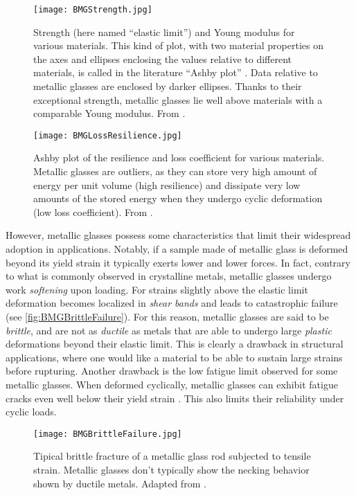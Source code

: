 \begin{figure} 
\centering 
\texttt{[image: BMGStrength.jpg]} 
\caption{Strength (here named ``elastic limit'') and Young modulus for various materials. This kind of plot, with two material properties on the axes and ellipses enclosing the values relative to different materials, is called in the literature ``Ashby plot'' \cite{ashby2005materials}. Data relative to metallic glasses are enclosed by darker ellipses. Thanks to their exceptional strength, metallic glasses lie well above materials with a comparable Young modulus. From \cite{ashby2006metallic}. \label{fig:BMGStrength}}
\end{figure}

\begin{figure} 
\centering 
\texttt{[image: BMGLossResilience.jpg]} 
\caption{Ashby plot of the resilience and loss coefficient for various materials. Metallic glasses are outliers, as they can store very high amount of energy per unit volume (high resilience) and dissipate very low amounts of the stored energy when they undergo cyclic deformation (low loss coefficient). From \cite{ashby2006metallic}. \label{fig:BMGStorage}}
\end{figure}

However, metallic glasses possess some characteristics that limit their widespread adoption in applications. Notably, if a sample made of metallic glass is deformed beyond its yield strain it typically exerts lower and lower forces. In fact, contrary to what is commonly observed in crystalline metals, metallic glasses undergo work \emph{softening} upon loading. For strains slightly above the elastic limit deformation becomes localized in \emph{shear bands} and leads to catastrophic failure (see \autoref{fig:BMGBrittleFailure}). For this reason, metallic glasses are said to be \emph{brittle}, and are not as \emph{ductile} as metals that are able to undergo large \emph{plastic} deformations beyond their elastic limit. This is clearly a drawback in structural applications, where one would like a material to be able to sustain large strains before rupturing.
Another drawback is the low fatigue limit \cite{schuh2007mechanical} observed for some metallic glasses. When deformed cyclically, metallic glasses can exhibit fatigue cracks even well below their yield strain \cite{peter2002fatigue}. This also limits their reliability under cyclic loads.

\begin{figure} 
\centering 
\texttt{[image: BMGBrittleFailure.jpg]} 
\caption{Tipical brittle fracture of a metallic glass rod subjected to tensile strain. Metallic glasses don't typically show the necking behavior shown by ductile metals. Adapted from \cite{hofmann2008designing}. \label{fig:BMGBrittleFailure}}
\end{figure}

